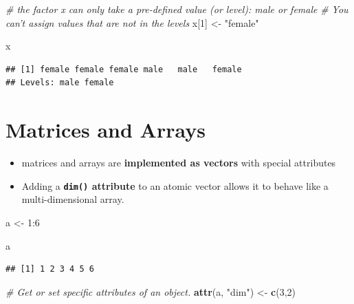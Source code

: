 \documentclass[]{book}
\newenvironment{Shaded}{\begin{snugshade}}{\end{snugshade}}
\newcommand{\KeywordTok}[1]{\textcolor[rgb]{0.13,0.29,0.53}{\textbf{{#1}}}}
\newcommand{\DecValTok}[1]{\textcolor[rgb]{0.00,0.00,0.81}{{#1}}}
\newcommand{\StringTok}[1]{\textcolor[rgb]{0.31,0.60,0.02}{{#1}}}
\newcommand{\CommentTok}[1]{\textcolor[rgb]{0.56,0.35,0.01}{\textit{{#1}}}}
\newcommand{\NormalTok}[1]{{#1}}
\providecommand{\tightlist}{%
  \setlength{\itemsep}{0pt}\setlength{\parskip}{0pt}}
\begin{document}
\begin{Shaded}
\begin{Highlighting}[]
\CommentTok{# the factor x can only take a pre-defined value (or level): male or female}
\CommentTok{# You can't assign values that are not in the levels}
\NormalTok{x[}\DecValTok{1}\NormalTok{] <-}\StringTok{ "female"}
\end{Highlighting}
\end{Shaded}

\begin{Shaded}
\begin{Highlighting}[]
\NormalTok{x}
\end{Highlighting}
\end{Shaded}

\begin{verbatim}
## [1] female female female male   male   female
## Levels: male female
\end{verbatim}

\section{Matrices and Arrays}\label{matrices-and-arrays}

\begin{itemize}
\tightlist
\item
  matrices and arrays are \textbf{implemented as vectors} with special
  attributes
\item
  Adding a \textbf{\texttt{dim()} attribute} to an atomic vector allows
  it to behave like a multi-dimensional array.
\end{itemize}

\begin{Shaded}
\begin{Highlighting}[]
\NormalTok{a <-}\StringTok{ }\DecValTok{1}\NormalTok{:}\DecValTok{6}
\end{Highlighting}
\end{Shaded}

\begin{Shaded}
\begin{Highlighting}[]
\NormalTok{a}
\end{Highlighting}
\end{Shaded}

\begin{verbatim}
## [1] 1 2 3 4 5 6
\end{verbatim}

\begin{Shaded}
\begin{Highlighting}[]
\CommentTok{# Get or set specific attributes of an object.}
\KeywordTok{attr}\NormalTok{(a, }\StringTok{"dim"}\NormalTok{) <-}\StringTok{ }\KeywordTok{c}\NormalTok{(}\DecValTok{3}\NormalTok{,}\DecValTok{2}\NormalTok{)}
\end{Highlighting}
\end{Shaded}
\end{document}
